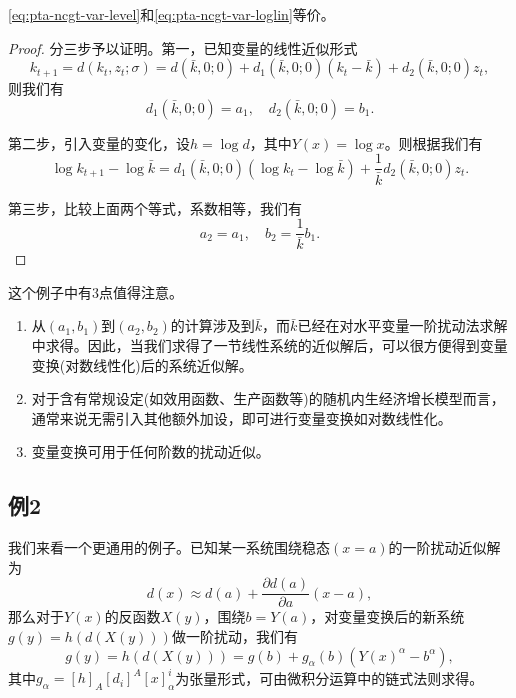 \begin{proposition}
  \eqref{eq:pta-ncgt-var-level}和\eqref{eq:pta-ncgt-var-loglin}等价。
\end{proposition}
\begin{proof}
  分三步予以证明。第一，已知变量的线性近似形式
  \begin{equation*}
    k_{t+1} = d(k_t, z_t ; \sigma) = d(\bar{k}, 0 ; 0) + d_1 (\bar{k}, 0;0) \left(k_t - \bar{k}\right) + d_2(\bar{k},0;0) z_t,
  \end{equation*}
  则我们有
  \begin{equation*}
    d_1(\bar{k},0;0) = a_1, \quad d_{2}(\bar{k}, 0;0) = b_1.
  \end{equation*}

  第二步，引入变量的变化，设$h = \log d$，其中$Y(x) = \log x$。则根据\cite{Judd:2003xy}我们有
  \begin{equation*}
    \log k_{t+1} - \log \bar{k} = d_1 (\bar{k},0;0) \left( \log k_t - \log \bar{k} \right) + \frac{1}{\bar{k}} d_2 (\bar{k},0;0) z_t.
  \end{equation*}

  第三步，比较上面两个等式，系数相等，我们有
  \begin{equation*}
    a_2 = a_1, \quad b_2 = \frac{1}{\bar{k}}b_1.
  \end{equation*}
\end{proof}

这个例子中有3点值得注意。
\begin{enumerate}
  \item 从$(a_1,b_1)$到$(a_2,b_2)$的计算涉及到$\bar{k}$，而$\bar{k}$已经在对水平变量一阶扰动法求解中求得。因此，当我们求得了一节线性系统的近似解后，可以很方便得到变量变换(对数线性化)后的系统近似解。
  \item 对于含有常规设定(如效用函数、生产函数等)的随机内生经济增长模型而言，通常来说无需引入其他额外加设，即可进行变量变换如对数线性化。
  \item 变量变换可用于任何阶数的扰动近似。
\end{enumerate}

\subsection{例2}
我们来看一个更通用的例子。已知某一系统围绕稳态$(x=a)$的一阶扰动近似解为
\begin{equation*}
  d(x) \approx d(a) + \frac{\partial d(a)}{\partial  a}(x-a),
\end{equation*}
那么对于$Y(x)$的反函数$X(y)$，围绕$b=Y(a)$，对变量变换后的新系统$g(y) = h(d(X(y)))$做一阶扰动，我们有
\begin{equation*}
  g(y) = h(d(X(y))) = g(b) + g_{\alpha}(b) \left( Y(x)^{\alpha} - b^{\alpha} \right),
\end{equation*}
其中$g_{\alpha} = \left[h\right]_A \left[d_i\right]^A \left[x\right]_{\alpha}^i$为张量形式，可由微积分运算中的链式法则求得。

